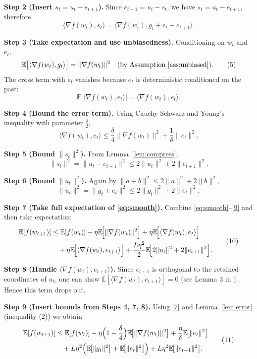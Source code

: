 \documentclass{article}
\begin{document}
\noindent\textbf{Step 2 (Insert $s_{t}=u_{t}-e_{t+1}$).}  
Since $e_{t+1}=u_{t}-s_{t}$, we have $s_{t}=u_{t}-e_{t+1}$, therefore
\[
\langle\nabla f(w_{t}),s_{t}\rangle
= \langle\nabla f(w_{t}),g_{t}+e_{t}-e_{t+1}\rangle.
\tag{4}
\]

\noindent\textbf{Step 3 (Take expectation and use unbiasedness).}  
Conditioning on $w_{t}$ and $e_{t}$,
\[
\mathbb{E}\bigl[\langle\nabla f(w_{t}),g_{t}\rangle\bigr]
= \|\nabla f(w_{t})\|^{2} \quad\text{(by Assumption~\ref{ass:unbiased})}.
\tag{5}
\]
The cross term with $e_{t}$ vanishes because $e_{t}$ is deterministic conditioned on the past:
\[
\mathbb{E}\bigl[\langle\nabla f(w_{t}),e_{t}\rangle\bigr]
= \langle\nabla f(w_{t}),e_{t}\rangle.
\tag{6}
\]

\noindent\textbf{Step 4 (Bound the error term).}  
Using Cauchy‑Schwarz and Young’s inequality with parameter $\frac{\delta}{2}$,
\[
\langle\nabla f(w_{t}),e_{t}\rangle
\le \frac{\delta}{4}\|\nabla f(w_{t})\|^{2}
      +\frac{1}{\delta}\|e_{t}\|^{2}.
\tag{7}
\]

\noindent\textbf{Step 5 (Bound $\|s_{t}\|^{2}$).}  
From Lemma~\ref{lem:compress},
\[
\|s_{t}\|^{2}
= \|u_{t}-e_{t+1}\|^{2}
\le 2\|u_{t}\|^{2}+2\|e_{t+1}\|^{2}.
\tag{8}
\]

\noindent\textbf{Step 6 (Bound $\|u_{t}\|^{2}$).}  
Again by $\|a+b\|^{2}\le2\|a\|^{2}+2\|b\|^{2}$,
\[
\|u_{t}\|^{2}= \|g_{t}+e_{t}\|^{2}
\le 2\|g_{t}\|^{2}+2\|e_{t}\|^{2}.
\tag{9}
\]

\noindent\textbf{Step 7 (Take full expectation of \eqref{eq:smooth}).}  
Combine \eqref{eq:smooth}–\eqref{9} and then take expectation:
\[
\begin{aligned}
\mathbb{E}[f(w_{t+1})]
&\le \mathbb{E}[f(w_{t})]
-\eta\mathbb{E}\!\Bigl[\|\nabla f(w_{t})\|^{2}\Bigr]
+\eta\mathbb{E}\!\Bigl[\langle\nabla f(w_{t}),e_{t}\rangle\Bigr] \\
&\quad +\eta\mathbb{E}\!\Bigl[\langle\nabla f(w_{t}),e_{t+1}\rangle\Bigr]
+\frac{L\eta^{2}}{2}\mathbb{E}\!\Bigl[2\|u_{t}\|^{2}+2\|e_{t+1}\|^{2}\Bigr].
\end{aligned}
\tag{10}
\]

\noindent\textbf{Step 8 (Handle $\langle\nabla f(w_{t}),e_{t+1}\rangle$).}  
Since $e_{t+1}$ is orthogonal to the retained coordinates of $u_{t}$, one can show  
$\mathbb{E}[\langle\nabla f(w_{t}),e_{t+1}\rangle]=0$ (see Lemma 3 in \cite{stich2018sparsified}). Hence this term drops out.

\noindent\textbf{Step 9 (Insert bounds from Steps 4, 7, 8).}  
Using \eqref{7} and Lemma~\ref{lem:error} (inequality (2)) we obtain
\[
\begin{aligned}
\mathbb{E}[f(w_{t+1})]
&\le \mathbb{E}[f(w_{t})]
-\eta\Bigl(1-\frac{\delta}{4}\Bigr)\mathbb{E}\!\bigl[\|\nabla f(w_{t})\|^{2}\bigr]
+\frac{\eta}{\delta}\mathbb{E}\!\bigl[\|e_{t}\|^{2}\bigr] \\
&\quad +L\eta^{2}\Bigl(\mathbb{E}\!\bigl[\|g_{t}\|^{2}\bigr]
+\mathbb{E}\!\bigl[\|e_{t}\|^{2}\bigr]\Bigr)
+L\eta^{2}\mathbb{E}\!\bigl[\|e_{t+1}\|^{2}\bigr].
\end{aligned}
\tag{11}
\]
\end{document}
